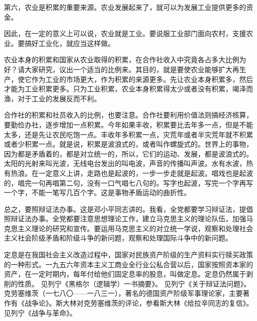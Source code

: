 第六，农业是积累的重要来源。农业发展起来了，就可以为发展工业提供更多的资金。

因此，在一定的意义上可以说，农业就是工业。要说服工业部门面向农村，支援农业。要搞好工业化，就应当这样做。

农业本身的积累和国家从农业取得的积累，在合作社收入中究竟各占多大比例为好？请大家研究，议出一个适当的比例来。其目的，就是要使农业能够扩大再生产，使它作为工业的市场更大，作为积累的来源更多。先让农业本身积累多，然后才能为工业积累更多。只为工业积累，农业本身积累得太少或者没有积累，竭泽而渔，对于工业的发展反而不利。

合作社的积累和社员收入的比例，也要注意。合作社要利用价值法则搞经济核算，要勤俭办社，逐步增加一点积累。今年如果丰收，积累要比去年多一点，但是不能太多，还是先让农民吃饱一点。丰收年多积累一点，灾荒年或者半灾荒年就不积累或者少积累一点。就是说，积累是波浪式的，或者叫作螺旋式的。世界上的事物，因为都是矛盾着的，都是对立统一的，所以，它们的运动、发展，都是波浪式的。太阳的光射来叫光波，无线电台发出的叫电波，声音的传播叫声波。水有水波，热有热浪。在一定意义上讲，走路也是起波的，一步一步走就是起波。唱戏也是起波的，唱完一句再唱第二句，没有一口气唱七八句的。写字也起波，写完一个字再写一个字，不能一笔写几百个字。这是事物矛盾运动的曲折性。

总之，要照辩证法办事。这是邓小平同志讲的。我看，全党都要学习辩证法，提倡照辩证法办事。全党都要注意思想理论工作，建立马克思主义的理论队伍，加强马克思主义理论的研究和宣传。要运用马克思主义的对立统一学说，观察和处理社会主义社会阶级矛盾和阶级斗争的新问题，观察和处理国际斗争中的新问题。


\begin{maonote}
定息是在我国社会主义改造过程中，国家对民族资产阶级的生产资料实行赎买政策的一种形式。一九五六年资本主义工商业全行业公私合营以后，国家按照资本家的资产，在一定时期内，每年付给他们固定息率的股息，叫做定息。定息仍然属于剥削的性质。
见列宁《黑格尔（逻辑学）一书摘要》。
见列宁《关于辩证法问题》。
克劳塞维茨（一七八〇——一八三一），著名的德国资产阶级军事理论家，主要著作有《战争论》。斯大林对克劳塞维茨的评论，参看斯大林《给拉辛同志的复信》。
见列宁《战争与革命》。
\end{maonote}
